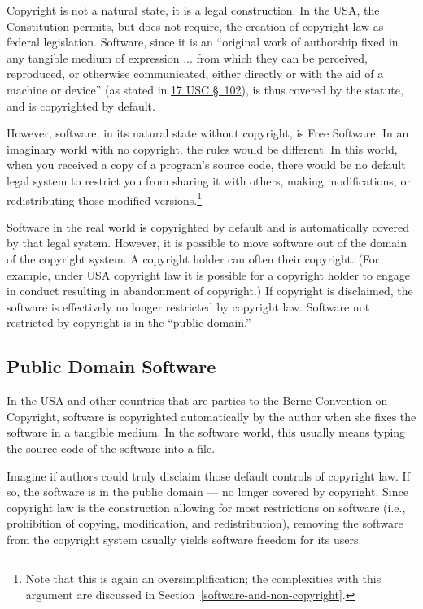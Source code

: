 Copyright is not a natural state, it is a legal construction. In the USA, the
Constitution permits, but does not require, the creation of copyright law as
federal legislation.  Software, since it is an ``original work of authorship
fixed in any tangible medium of expression ...  from which they can be
perceived, reproduced, or otherwise communicated, either directly or with the
aid of a machine or device'' (as stated in
\href{http://www.law.cornell.edu/uscode/text/17/102}{17 USC \S~102}), is thus
covered by the statute, and is copyrighted by default.

However, software, in its natural state without copyright, is Free
Software. In an imaginary world with no copyright, the rules would be
different. In this world, when you received a copy of a program's source
code, there would be no default legal system to restrict you from sharing it
with others, making modifications, or redistributing those modified
versions.\footnote{Note that this is again an oversimplification; the
  complexities with this argument are discussed in
  Section~\ref{software-and-non-copyright}.}

Software in the real world is copyrighted by default and is automatically
covered by that legal system.  However, it is possible to move software out
of the domain of the copyright system.  A copyright holder can often
 their copyright. (For example, under USA copyright law
it is possible for a copyright holder to engage in conduct resulting
in abandonment of copyright.)  If copyright is disclaimed, the software is
effectively no longer restricted by copyright law.   Software not restricted by copyright is in the
``public domain.''

\subsection{Public Domain Software}

In the USA and other countries that
are parties to the Berne Convention on Copyright, software is copyrighted
automatically by the author when she fixes the software in a tangible
medium.  In the software world, this usually means typing the source code
of the software into a file.

Imagine if authors could truly disclaim those default controls of copyright
law.  If so, the software is in the public domain --- no longer covered by
copyright.  Since copyright law is the construction allowing for most
restrictions on software (i.e., prohibition of copying, modification, and
redistribution), removing the software from the copyright system usually
yields software freedom for its users.

